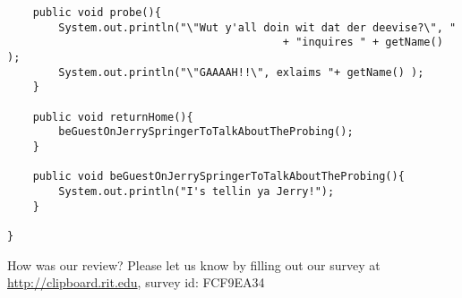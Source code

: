 \documentclass[11pt]{article}
\newenvironment{answer}{\large\lstset{basicstyle=\large}\color{white}}{}
\newenvironment{answer}{\large\lstset{basicstyle=\large}\color{red}}{}
\begin{document}
\begin{enumerate}
\begin{answer}
\begin{lstlisting}
    public void probe(){
        System.out.println("\"Wut y'all doin wit dat der deevise?\", "
                                           + "inquires " + getName() );
        System.out.println("\"GAAAAH!!\", exlaims "+ getName() );
    }

    public void returnHome(){
        beGuestOnJerrySpringerToTalkAboutTheProbing();
    }

    public void beGuestOnJerrySpringerToTalkAboutTheProbing(){
        System.out.println("I's tellin ya Jerry!");
    }

}

\end{lstlisting}
\end{answer}
\end{enumerate}



\vfill
\begin{framed}
How was our review? Please let us know by filling out our survey at\\
\url{http://clipboard.rit.edu}, survey id: FCF9EA34
\end{framed}
\end{document}
